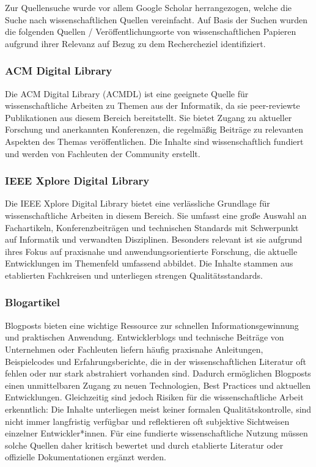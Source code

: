 Zur Quellensuche wurde vor allem Google Scholar herrangezogen, welche die Suche nach wissenschaftlichen Quellen
vereinfacht.
Auf Basis der Suchen wurden die folgenden Quellen / Veröffentlichungsorte von wissenschaftlichen Papieren aufgrund ihrer Relevanz
auf Bezug zu dem Rechercheziel identifiziert.

\subsubsection{ACM Digital Library}

Die ACM Digital Library (ACMDL) ist eine geeignete Quelle für wissenschaftliche Arbeiten 
zu Themen aus der Informatik, da sie peer-reviewte Publikationen aus diesem Bereich bereitstellt.
Sie bietet Zugang zu aktueller Forschung und anerkannten Konferenzen,
die regelmäßig Beiträge zu relevanten Aspekten des Themas veröffentlichen.
Die Inhalte sind wissenschaftlich fundiert und werden von Fachleuten der Community erstellt. \cite{ACM}

\subsubsection{IEEE Xplore Digital Library}

Die IEEE Xplore Digital Library bietet eine verlässliche Grundlage für wissenschaftliche Arbeiten
in diesem Bereich.
Sie umfasst eine große Auswahl an Fachartikeln, Konferenzbeiträgen und technischen Standards 
mit Schwerpunkt auf Informatik und verwandten Disziplinen.
Besonders relevant ist sie aufgrund ihres Fokus auf praxisnahe und anwendungsorientierte Forschung,
die aktuelle Entwicklungen im Themenfeld umfassend abbildet.
Die Inhalte stammen aus etablierten Fachkreisen und unterliegen strengen Qualitätsstandards. \cite{IEEE}

\subsubsection{Blogartikel}

Blogposts bieten eine wichtige Ressource zur schnellen Informationsgewinnung und praktischen Anwendung. 
Entwicklerblogs und technische Beiträge von Unternehmen oder Fachleuten liefern häufig praxisnahe Anleitungen,
Beispielcodes und Erfahrungsberichte, die in der wissenschaftlichen Literatur oft fehlen oder nur stark abstrahiert vorhanden sind. 
Dadurch ermöglichen Blogposts einen unmittelbaren Zugang zu neuen Technologien, Best Practices und aktuellen Entwicklungen.
Gleichzeitig sind jedoch Risiken für die wissenschaftliche Arbeit erkenntlich:
Die Inhalte unterliegen meist keiner formalen Qualitätskontrolle, sind nicht immer langfristig verfügbar und 
reflektieren oft subjektive Sichtweisen einzelner Entwickler*innen.
Für eine fundierte wissenschaftliche Nutzung müssen solche Quellen daher kritisch bewertet und 
durch etablierte Literatur oder offizielle Dokumentationen ergänzt werden.

